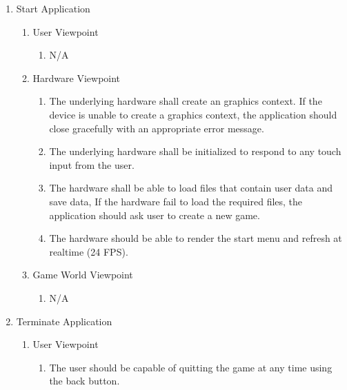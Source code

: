 \documentclass[]{article}
\begin{document}
\begin{enumerate}[{BE}1.]
	\item Start Application
	\begin{enumerate}[{VP1}.1]
		\item User Viewpoint
			\begin{enumerate}
				\item N/A
			\end{enumerate}
		\item Hardware Viewpoint
			\begin{enumerate}
				\item The underlying hardware shall create an graphics context. If the device is unable to create a graphics context, the application should close gracefully with an appropriate error message.
				\item The underlying hardware shall be initialized to respond to any touch input from the user.
				\item The hardware shall be able to load files that contain user data and save data, If the hardware fail to load the required files, the application should ask user to create a new game.
				\item The hardware should be able to render the start menu and refresh at realtime (24 FPS). 
			\end{enumerate}
		\item Game World Viewpoint
			\begin{enumerate}
				\item N/A
			\end{enumerate}
			
	\end{enumerate}
	\item Terminate Application
	\begin{enumerate}[{VP2}.1]
	\item User Viewpoint
			\begin{enumerate}
				\item The user should be capable of quitting the game at any time using the back button.


\end{enumerate}
\end{enumerate}
\end{enumerate}
\end{document}
